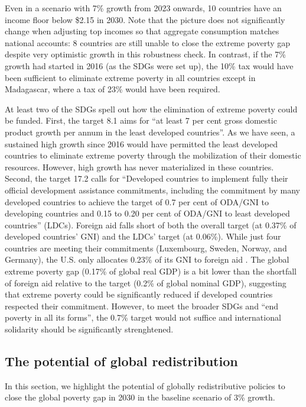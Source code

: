 \documentclass[12pt,english]{article}
\begin{document}
Even in a scenario with 7\% growth from 2023 onwards, 10 countries have an income floor below \$2.15 in 2030. Note that the picture does not significantly change when adjusting top incomes so that aggregate consumption matches national accounts: %
8 countries are still unable to close the extreme poverty gap despite very optimistic growth in this robustness check. In contrast, if the 7\% growth had started in 2016 (as the SDGs were set up), the 10\% tax would have been sufficient to eliminate extreme poverty in all countries except in Madagascar, where a tax of 23\% would have been required.

At least two of the SDGs spell out how the elimination of extreme poverty could be funded. %
First, the target 8.1 aims for ``at least 7 per cent gross domestic product growth per annum in the least developed countries''. As we have seen, a sustained high growth since 2016 would have permitted the least developed countries to eliminate extreme poverty through the mobilization of their domestic resources. However, high growth has never materialized in these countries. 
Second, the target 17.2 calls for ``Developed countries to implement fully their official development assistance commitments, including the commitment by many developed countries to achieve the target of 0.7 per cent of ODA/GNI to developing countries and 0.15 to 0.20 per cent of ODA/GNI to least developed countries'' (LDCs). Foreign aid falls short of both the overall target (at 0.37\% of developed countries' GNI) and the LDCs' target (at 0.06\%). While just four countries are meeting their commitments (Luxembourg, Sweden, Norway, and Germany), the U.S. only allocates 0.23\% of its GNI to foreign aid \citep{oecd_oda_2023}. The global extreme poverty gap (0.17\% of global real GDP) is a bit lower than the shortfall of foreign aid relative to the target (0.2\% of global nominal GDP), suggesting that extreme poverty could be significantly reduced if developed countries respected their commitment. %
However, to meet the broader SDGs and ``end poverty in all its forms'', the 0.7\% target would not suffice and international solidarity should be significantly strenghtened. %

\subsection{The potential of global redistribution} %

In this section, we highlight the potential of globally redistributive policies to close the global poverty gap in 2030 in the baseline scenario of 3\% growth. %
\end{document}
